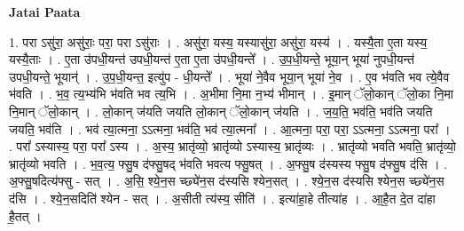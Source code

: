 \documentclass[17pt]{extarticle}
\begin{document}
\textbf{Jatai Paata} \newline

1. परा ऽसु॑रा॒ असु॑राः॒ परा॒ परा ऽसु॑राः । . असु॑रा॒ यस्य॒ यस्यासु॑रा॒ असु॑रा॒ यस्य॑ । . यस्यै॒ता ए॒ता यस्य॒ यस्यै॒ताः । . ए॒ता उ॑पधी॒यन्त॑ उपधी॒यन्त॑ ए॒ता ए॒ता उ॑पधी॒यन्ते᳚ । . उ॒प॒धी॒यन्ते॒ भूया॒न् भूया॑ नुपधी॒यन्त॑ उपधी॒यन्ते॒ भूयान्॑ । . उ॒प॒धी॒यन्त॒ इत्यु॑प - धी॒यन्ते᳚ । . भूया॑ ने॒वैव भूया॒न् भूया॑ ने॒व । . ए॒व भ॑वति भव त्ये॒वैव भ॑वति । . भ॒व॒ त्य॒भ्य॑भि भ॑वति भव त्य॒भि । . अ॒भीमा नि॒मा न॒भ्य॑ भीमान् । . इ॒मान् ॅलो॒कान् ॅलो॒का नि॒मा नि॒मान् ॅलो॒कान् । . लो॒कान् ज॑यति जयति लो॒कान् ॅलो॒कान् ज॑यति । . ज॒य॒ति॒ भव॑ति॒ भव॑ति जयति जयति॒ भव॑ति । . भव॑ त्या॒त्मना॒ ऽऽत्मना॒ भव॑ति॒ भव॑ त्या॒त्मना᳚ । . आ॒त्मना॒ परा॒ परा॒ ऽऽत्मना॒ ऽऽत्मना॒ परा᳚ । . परा᳚ ऽस्यास्य॒ परा॒ परा᳚ ऽस्य । . अ॒स्य॒ भ्रातृ॑व्यो॒ भ्रातृ॑व्यो ऽस्यास्य॒ भ्रातृ॑व्यः । . भ्रातृ॑व्यो भवति भवति॒ भ्रातृ॑व्यो॒ भ्रातृ॑व्यो भवति । . भ॒व॒त्य॒ फ्सु॒ष द॑फ्सु॒षद् भ॑वति भवत्य फ्सु॒षत् । . अ॒फ्सु॒ष द॑स्यस्य फ्सु॒ष द॑फ्सु॒ष द॑सि । . अ॒फ्सु॒षदित्य॑फ्सु - सत् । . अ॒सि॒ श्ये॒न॒स च्छ्ये॑न॒स द॑स्यसि श्येन॒सत् । . श्ये॒न॒स द॑स्यसि श्येन॒स च्छ्ये॑न॒स द॑सि । . श्ये॒न॒सदिति॑ श्येन - सत् । . अ॒सीती त्य॑स्य॒ सीति॑ । . इत्या॑हा॒हे तीत्या॑ह । . आ॒है॒त दे॒त दा॑हा है॒तत् । \newline
\end{document}
